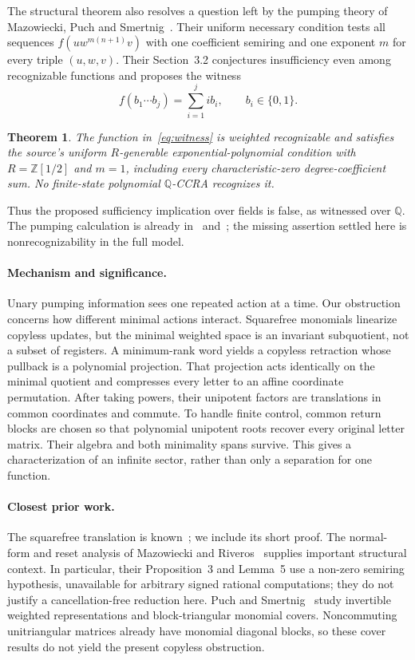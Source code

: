 \documentclass[acmlarge,screen,11pt,nonacm]{acmart}
\newcommand{\Q}{\mathbb{Q}}
\newcommand{\Z}{\mathbb{Z}}
\newtheorem{theorem}{Theorem}
\theoremstyle{definition}
\begin{document}
The structural theorem also resolves a question left by the pumping theory of Mazowiecki, Puch and Smertnig~\cite{MPS26}. Their uniform necessary condition tests all sequences $f(uw^{m(n+1)}v)$ with one coefficient semiring and one exponent $m$ for every triple $(u,w,v)$. Their Section~3.2 conjectures insufficiency even among recognizable functions and proposes the witness
\begin{equation}\label{eq:witness}
 f(b_1\cdots b_j)=\sum_{i=1}^j i b_i,\qquad b_i\in\{0,1\}.
\end{equation}
\begin{theorem}\label{thm:main}
The function in~\eqref{eq:witness} is weighted recognizable and satisfies the source's uniform $R$-generable exponential-polynomial condition with $R=\Z[1/2]$ and $m=1$, including every characteristic-zero degree-coefficient sum. No finite-state polynomial $\Q$-CCRA recognizes it.
\end{theorem}
Thus the proposed sufficiency implication over fields is false, as witnessed over $\Q$. The pumping calculation is already in~\cite[Example~26]{MPS26} and~\cite[Appendix~B.4]{MPSfull}; the missing assertion settled here is nonrecognizability in the full model.

\paragraph{Mechanism and significance.}
Unary pumping information sees one repeated action at a time. Our obstruction concerns how different minimal actions interact. Squarefree monomials linearize copyless updates, but the minimal weighted space is an invariant subquotient, not a subset of registers. A minimum-rank word yields a copyless retraction whose pullback is a polynomial projection. That projection acts identically on the minimal quotient and compresses every letter to an affine coordinate permutation. After taking powers, their unipotent factors are translations in common coordinates and commute. To handle finite control, common return blocks are chosen so that polynomial unipotent roots recover every original letter matrix. Their algebra and both minimality spans survive. This gives a characterization of an infinite sector, rather than only a separation for one function.

\paragraph{Closest prior work.}
The squarefree translation is known~\cite[Lemma~50]{MPSfull}; we include its short proof. The normal-form and reset analysis of Mazowiecki and Riveros~\cite{MR19} supplies important structural context. In particular, their Proposition~3 and Lemma~5 use a non-zero semiring hypothesis, unavailable for arbitrary signed rational computations; they do not justify a cancellation-free reduction here. Puch and Smertnig~\cite[Theorem~3.4, Corollary~3.5 and Proposition~9.4]{PS24} study invertible weighted representations and block-triangular monomial covers. Noncommuting unitriangular matrices already have monomial diagonal blocks, so these cover results do not yield the present copyless obstruction.
\end{document}
